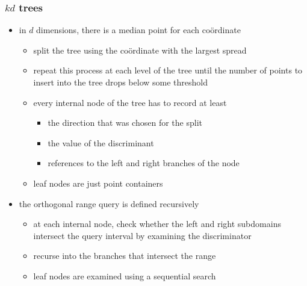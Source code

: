 \begin{frame}[fragile]
%
  \frametitle{$kd$ trees}
%
  \begin{itemize}
%
  \item in $d$ dimensions, there is a median point for each co\"ordinate
    \begin{itemize}
    \item split the tree using the co\"ordinate with the largest spread
    \item repeat this process at each level of the tree until the number of points to insert
      into the tree drops below some threshold
    \item every internal node of the tree has to record at least
      \begin{itemize}
      \item the direction that was chosen for the split
      \item the value of the discriminant
      \item references to the left and right branches of the node
      \end{itemize}
    \item leaf nodes are just point containers
    \end{itemize}
%
  \item the orthogonal range query is defined recursively
    \begin{itemize}
    \item at each internal node, check whether the left and right subdomains intersect the
      query interval by examining the discriminator
    \item recurse into the branches that intersect the range
    \item leaf nodes are examined using a sequential search
    \end{itemize}
%
  \end{itemize}
%
\end{frame}

